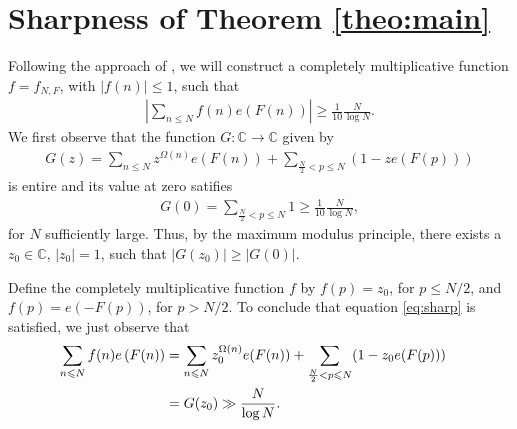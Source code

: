 \documentclass[12pt]{amsart}
\def\C{{\mathbb C}}
\def\\{\cr}
\def\le{\leqslant}
\def\ge{\geqslant}
\begin{document}
\section{Sharpness of Theorem \ref{theo:main}}
\label{sec:sharp} 
Following the approach of \cite{M-V}, we will construct a completely multiplicative function $f=f_{N,F}$, with $|f(n)| \le 1$, such that
\begin{align}
\label{eq:sharp}
\left|\sum_{n\le N} f(n)e\left(F(n)\right)\right| \ge \frac{1}{10} \frac{N}{\log{N}}.
\end{align} 
We first observe that the function  $G: \C \rightarrow \C$ given by
\begin{align*}
G(z) = \sum_{n\le N} z^{\Omega(n)}e(F(n)) + \sum_{ \frac{N}{2} < p \le N} (1-ze(F(p)))
\end{align*} 
is entire and its value at zero satifies
\begin{align*}
G(0) = \sum_{ \frac{N}{2} < p \le N} 1 \ge \frac1{10} \frac{N}{\log{N}},
\end{align*} 
for $N$ sufficiently large.
Thus, by the maximum modulus principle, there exists a $z_0 \in \C$, $|z_0| = 1$, such that $|G(z_0)| \ge |G(0)|$. 

Define the completely multiplicative function $f$ by  $f(p) = z_0$, for $ p \le N/2$, and $f(p)=e(-F(p))$, for $p > N/2$. To conclude that equation \eqref{eq:sharp} is satisfied, we just observe that
\begin{align*}
\sum_{n\le N} f(n)e\left(F(n)\right) & = \sum_{n\le N} z_0^{\Omega(n)}e(F(n)) + \sum_{ \frac{N}{2} < p \le N} (1-z_0e(F(p)))\\
& = G(z_0) \gg \frac{N}{\log{N}}.
\end{align*}
\end{document}
